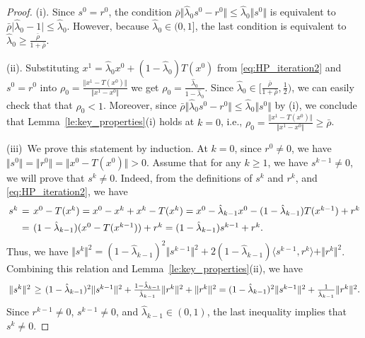 \documentclass{article}
\theoremstyle{plain}
\theoremstyle{definition}
\newcommand{\norms}[1]{\Vert#1\Vert}
\newcommand{\iprods}[1]{\langle #1\rangle}
\newcommand{\0}{\boldsymbol{0}}
\begin{document}
\begin{proof}
(i). Since $s^0 = r^0$, the condition $\bar{\rho} \norms{\hat{\lambda}_0s^0 - r^0}  \leq \hat{\lambda}_0\norms{s^0}$ is equivalent to $\bar{\rho}\vert\hat{\lambda}_0 - 1\vert \leq \hat{\lambda}_0$.
However, because $\hat{\lambda}_0 \in (0, 1]$, the last condition is equivalent to $\hat{\lambda}_0 \geq \frac{\bar{\rho}}{1 + \bar{\rho}}$.
 
 (ii). Substituting $x^1 = \hat{\lambda}_0x^0 + (1-\hat{\lambda}_0)T(x^0)$ from \eqref{eq:HP_iteration2} and $s^0 = r^0$ into $\rho_0 =  \frac{\norms{x^1 - T(x^0)}}{\norms{x^1 - x^0}}$ we get $\rho_0 = \frac{\hat{\lambda}_0}{1-\hat{\lambda}_0}$.
 Since $\hat{\lambda}_0 \in \big[\frac{ \bar{\rho}}{1 + \bar{\rho}}, \frac{1}{2}\big)$, we can easily check that that $\rho_0  < 1$.
 Moreover, since $\bar{\rho} \norms{\hat{\lambda}_0s^0 - r^0}  \leq \hat{\lambda}_0\norms{s^0}$ by (i), we conclude that Lemma~\ref{le:key_properties}(i) holds at $k = 0$, i.e., $\rho_0 =  \frac{\norms{x^1 - T(x^0)}}{\norms{x^1 - x^0}} \geq \bar{\rho}$.
 
 (iii)~We prove this statement by induction.
 At $k = 0$, since $r^0 \neq 0$, we have $\norms{s^0} = \norms{r^0} = \norms{x^0 - T(x^0)} > 0$.
 Assume that for any $k \geq 1$, we have $s^{k-1} \neq 0$, we will prove that $s^k \neq 0$.
 Indeed, from the definitions of $s^k$ and $r^k$, and \eqref{eq:HP_iteration2}, we have 
\begin{equation*}
\arraycolsep=0.2em
\begin{array}{lcl}
s^k &= & x^0 - T(x^k) = x^0 - x^k + x^k - T(x^k) = x^0 - \hat{\lambda}_{k-1}x^0 - (1-\hat{\lambda}_{k-1})T(x^{k-1}) + r^k \vspace{1ex}\\
& = & (1-\hat{\lambda}_{k-1})(x^0 - T(x^{k-1})) + r^k =  (1-\hat{\lambda}_{k-1})s^{k-1} + r^k.
\end{array}
\end{equation*}
Thus, we have $\norms{s^k}^2 = (1-\hat{\lambda}_{k-1})^2\norms{s^{k-1}}^2 + 2(1-\hat{\lambda}_{k-1})\iprods{s^{k-1}, r^k} + \norms{r^k}^2$.
Combining this relation and Lemma~\ref{le:key_properties}(ii), we have
\begin{equation*}
\arraycolsep=0.2em
\begin{array}{lcl}
\norms{s^k}^2 & \geq &  (1-\hat{\lambda}_{k-1})^2\norms{s^{k-1}}^2 + \frac{1-\hat{\lambda}_{k-1}}{\hat{\lambda}_{k-1}}\norms{r^k}^2 + \norms{r^k}^2 = (1-\hat{\lambda}_{k-1})^2\norms{s^{k-1}}^2 + \frac{1}{\hat{\lambda}_{k-1}}\norms{r^k}^2.
\end{array}
\end{equation*}
Since $r^{k-1} \neq 0$, $s^{k-1} \neq 0$, and $\hat{\lambda}_{k-1} \in (0, 1)$, the last inequality implies that $s^k \neq 0$.


\end{proof}
\end{document}
